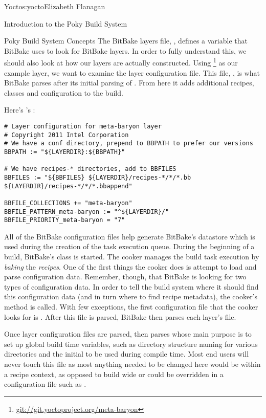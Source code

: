 \begin{aosachapter}{Yocto}{s:yocto}{Elizabeth Flanagan}
\begin{aosasect1}{Introduction to the Poky Build System}
\begin{aosasect2}{Poky Build System Concepts}
The BitBake layers file, , defines a variable  that
BitBake uses to look for BitBake layers. In order to fully understand
this, we should also look at how our layers are actually
constructed. Using
 \footnote{\url{git://git.yoctoproject.org/meta-baryon}} as
our example layer, we want to examine the layer configuration
file. This file, , is what BitBake parses after its
initial parsing of . From here it adds additional
recipes, classes and configuration to the build.


Here's 's :

\begin{verbatim}
# Layer configuration for meta-baryon layer
# Copyright 2011 Intel Corporation
# We have a conf directory, prepend to BBPATH to prefer our versions
BBPATH := "${LAYERDIR}:${BBPATH}"

# We have recipes-* directories, add to BBFILES
BBFILES := "${BBFILES} ${LAYERDIR}/recipes-*/*/*.bb ${LAYERDIR}/recipes-*/*/*.bbappend"

BBFILE_COLLECTIONS += "meta-baryon"
BBFILE_PATTERN_meta-baryon := "^${LAYERDIR}/"
BBFILE_PRIORITY_meta-baryon = "7"
\end{verbatim}

All of the BitBake configuration files help generate BitBake's
datastore which is used during the creation of the task execution
queue. During the beginning of a build, BitBake's  class is
started. The cooker manages the build task execution by \emph{baking} the
\emph{recipes}. One of the first things the cooker does is attempt to load
and parse configuration data. Remember, though, that BitBake is
looking for two types of configuration data. In order to tell the
build system where it should find this configuration data (and in turn
where to find recipe metadata), the cooker's 
method is called.  With few exceptions, the first configuration file
that the cooker looks for is . After this file is parsed,
BitBake then parses each layer's  file. 

Once layer configuration files are parsed, 
then parses  whose main purpose is to set up global build
time variables, such as directory structure naming for various 
directories and the initial  to be used during compile time.
Most end users will never touch this file as most anything needed to
be changed here would be within a recipe context, as opposed to build
wide or could be overridden in a configuration file such as .


\end{aosasect2}
\end{aosasect1}
\end{aosachapter}
